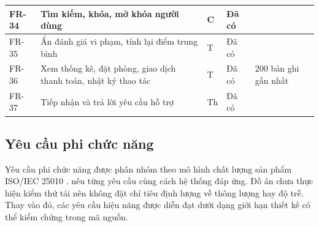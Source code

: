 \begin{rtable}
\begin{longtable}{|C{1.25cm}|L{7.3cm}|C{1.0cm}|C{1.5cm}|L{3.6cm}|}
FR-34 & Tìm kiếm, khóa, mở khóa người dùng & C & Đã có & \\ \hline
FR-35 & Ẩn đánh giá vi phạm, tính lại điểm trung bình & T & Đã có & \\ \hline
FR-36 & Xem thống kê, đặt phòng, giao dịch thanh toán, nhật ký thao tác & T & Đã có & 200 bản ghi gần nhất \\ \hline
FR-37 & Tiếp nhận và trả lời yêu cầu hỗ trợ & Th & Đã có & \\ \hline
\end{longtable}
\end{rtable}

\subsection{Yêu cầu phi chức năng}

Yêu cầu phi chức năng được phân nhóm theo mô hình chất lượng sản phẩm ISO/IEC 25010 \cite{iso25010}.  nêu từng yêu cầu cùng cách hệ thống đáp ứng. Đồ án chưa thực hiện kiểm thử tải nên không đặt chỉ tiêu định lượng về thông lượng hay độ trễ. Thay vào đó, các yêu cầu hiệu năng được diễn đạt dưới dạng giới hạn thiết kế có thể kiểm chứng trong mã nguồn.

